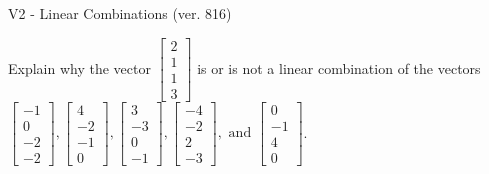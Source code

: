 \begin{exercise}
  \begin{exerciseTitle}V2 - Linear Combinations (ver. 816)\end{exerciseTitle}
  \begin{exerciseStatement}
    Explain why the vector \(\left[\begin{array}{c}
2 \\
1 \\
1 \\
3
\end{array}\right]\)  is or is not a linear 
	combination of the vectors \(\left[\begin{array}{c}
-1 \\
0 \\
-2 \\
-2
\end{array}\right] , \left[\begin{array}{c}
4 \\
-2 \\
-1 \\
0
\end{array}\right] , \left[\begin{array}{c}
3 \\
-3 \\
0 \\
-1
\end{array}\right] , \left[\begin{array}{c}
-4 \\
-2 \\
2 \\
-3
\end{array}\right] , \text{ and } \left[\begin{array}{c}
0 \\
-1 \\
4 \\
0
\end{array}\right]\).
	



\end{exerciseStatement}
\end{exercise}
